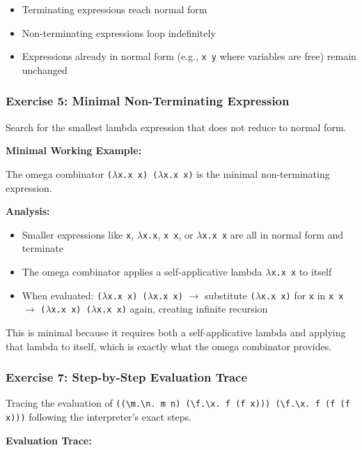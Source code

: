 \documentclass{article}
\theoremstyle{theorem}
\theoremstyle{definition}
\theoremstyle{remark}
\begin{document}
\begin{itemize}
\item Terminating expressions reach normal form
\item Non-terminating expressions loop indefinitely
\item Expressions already in normal form (e.g., \texttt{x y} where variables are free) remain unchanged
\end{itemize}

\subsubsection{Exercise 5: Minimal Non-Terminating Expression}

Search for the smallest lambda expression that does not reduce to normal form.

\textbf{Minimal Working Example:}

The omega combinator \texttt{($\lambda$x.x x) ($\lambda$x.x x)} is the minimal non-terminating expression. 

\textbf{Analysis:}

\begin{itemize}
\item Smaller expressions like \texttt{x}, \texttt{$\lambda$x.x}, \texttt{x x}, or \texttt{$\lambda$x.x x} are all in normal form and terminate
\item The omega combinator applies a self-applicative lambda \texttt{$\lambda$x.x x} to itself
\item When evaluated: \texttt{($\lambda$x.x x) ($\lambda$x.x x)} $\to$ substitute \texttt{($\lambda$x.x x)} for \texttt{x} in \texttt{x x} $\to$ \texttt{($\lambda$x.x x) ($\lambda$x.x x)} again, creating infinite recursion
\end{itemize}

This is minimal because it requires both a self-applicative lambda and applying that lambda to itself, which is exactly what the omega combinator provides.

\subsubsection{Exercise 7: Step-by-Step Evaluation Trace}

Tracing the evaluation of \texttt{((\textbackslash m.\textbackslash n. m n) (\textbackslash f.\textbackslash x. f (f x))) (\textbackslash f.\textbackslash x. f (f (f x)))} following the interpreter's exact steps.

\textbf{Evaluation Trace:}
\end{document}
